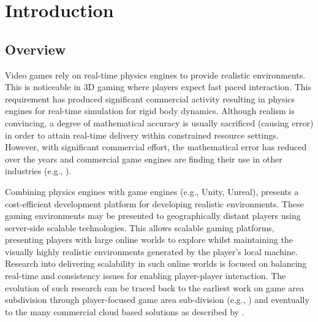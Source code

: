 \chapter{Introduction}

\section{Overview}

Video games rely on real-time physics engines to provide realistic environments. This is noticeable in 3D gaming where players expect fast paced interaction. This requirement has produced significant commercial activity resulting in physics engines for real-time simulation for rigid body dynamics. Although realism is convincing, a degree of mathematical accuracy is usually sacrificed (causing error) in order to attain real-time delivery within constrained resource settings. However, with significant commercial effort, the mathematical error has reduced over the years and commercial game engines are finding their use in other industries (e.g.,  \cite{Xu2017, Lu2017, Shah2018}).

Combining physics engines with game engines (e.g., Unity, Unreal), presents a cost-efficient development platform for developing realistic environments. These gaming environments may be presented to geographically distant players using server-side scalable technologies. This allows scalable gaming platforms, presenting players with large online worlds to explore whilst maintaining the visually highly realistic environments generated by the player's local machine. Research into delivering scalability in such online worlds is focused on balancing real-time and consistency issues for enabling player-player interaction. The evolution of such research can be traced back to the earliest work on game area subdivision \cite{Npsnet} through player-focused game area sub-division (e.g., \cite{Morgan2005InterestManagement, Greenhalgh}) and eventually to the many commercial cloud based solutions as described by \cite{iCloudAccess}.

